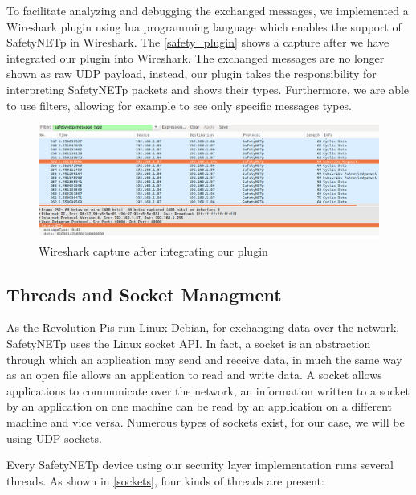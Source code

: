 To facilitate analyzing and debugging the exchanged messages, we implemented a Wireshark plugin using lua
programming language which enables the support of SafetyNETp in Wireshark. The \autoref{safety_plugin} shows a
capture after we have integrated our plugin into Wireshark. The exchanged messages are no longer shown as raw
UDP payload, instead, our plugin takes the responsibility for interpreting SafetyNETp packets and shows
their types. Furthermore, we are able to use filters, allowing for example to see only specific messages types.

\begin{figure}[H]
\centering
\includegraphics[width=17cm]{figures/realization/safety_plugin.png}
\caption{Wireshark capture after integrating our plugin}\label{safety_plugin}
\end{figure}

\subsection{Threads and Socket Managment}

As the Revolution Pis run Linux Debian, for exchanging data over the network,
SafetyNETp uses the Linux socket API. In fact, a socket is an abstraction through which an application
may send and receive data, in much the same way as an open file allows an application to read and write data.
A socket allows applications to communicate over the network, an information written to a socket
by an application on one machine can be read by an application on a different machine and
vice versa. Numerous types of sockets exist, for our case, we will be using UDP sockets.

Every SafetyNETp device using our security layer implementation runs several threads.
As shown in \autoref{sockets}, four kinds of threads are present:

